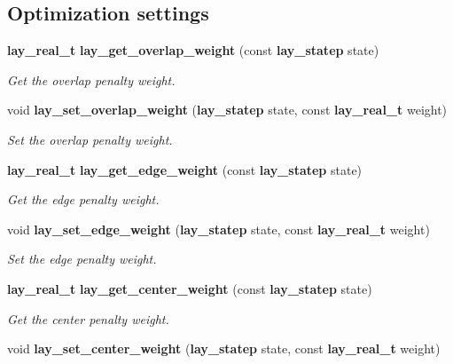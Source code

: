 \subsection*{Optimization settings}
\begin{CompactItemize}
\item 
{\bf lay\_\-real\_\-t} {\bf lay\_\-get\_\-overlap\_\-weight} (const  {\bf lay\_\-statep} state)\label{layout_8h_a5}

\begin{CompactList}\small\item\em Get the overlap penalty weight. \item\end{CompactList}\item 
void {\bf lay\_\-set\_\-overlap\_\-weight} ({\bf lay\_\-statep} state, const  {\bf lay\_\-real\_\-t} weight)\label{layout_8h_a6}

\begin{CompactList}\small\item\em Set the overlap penalty weight. \item\end{CompactList}\item 
{\bf lay\_\-real\_\-t} {\bf lay\_\-get\_\-edge\_\-weight} (const  {\bf lay\_\-statep} state)\label{layout_8h_a7}

\begin{CompactList}\small\item\em Get the edge penalty weight. \item\end{CompactList}\item 
void {\bf lay\_\-set\_\-edge\_\-weight} ({\bf lay\_\-statep} state, const  {\bf lay\_\-real\_\-t} weight)\label{layout_8h_a8}

\begin{CompactList}\small\item\em Set the edge penalty weight. \item\end{CompactList}\item 
{\bf lay\_\-real\_\-t} {\bf lay\_\-get\_\-center\_\-weight} (const  {\bf lay\_\-statep} state)\label{layout_8h_a9}

\begin{CompactList}\small\item\em Get the center penalty weight. \item\end{CompactList}\item 
void {\bf lay\_\-set\_\-center\_\-weight} ({\bf lay\_\-statep} state, const  {\bf lay\_\-real\_\-t} weight)\label{layout_8h_a10}


\end{CompactItemize}
